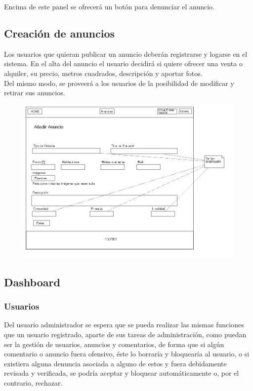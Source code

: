 Encima de este panel se ofrecer\'{a} un bot\'{o}n para denunciar el anuncio.




\subsection{Creaci\'{o}n de anuncios}



Los usuarios que quieran publicar un anuncio deber\'{a}n registrarse y logarse en el sistema. 
En el alta del anuncio el usuario decidir\'{a} si quiere ofrecer una venta o alquiler, su precio, metros cuadrados, descripci\'{o}n y aportar fotos. \\

Del mismo modo, se proveer\'{a} a los usuarios de la posibilidad de modificar y retirar sus anuncios. 


\begin{figure}[h!]
\centering
\includegraphics[width=1\textwidth]{Img/VisionAplicacion/vision_7.jpg}
\end{figure}

\newpage{\pagestyle{empty}\cleardoublepage}


\subsection{Dashboard}
\subsubsection{Usuarios}
Del usuario administrador se espera que se pueda realizar las mismas funciones que un usuario registrado, aparte de sus tareas de administraci\'{o}n, como puedan ser la gesti\'{o}n de usuarios, anuncios y comentarios, de forma que si alg\'{u}n comentario o anuncio fuera ofensivo, \'{e}ste lo borrar\'{i}a y bloquear\'{i}a al usuario, o si existiera alguna denuncia asociada a alguno de estos y fuera debidamente revisada y verificada, se podr\'{i}a aceptar y bloquear autom\'{a}ticamente o, por el contrario, rechazar.

